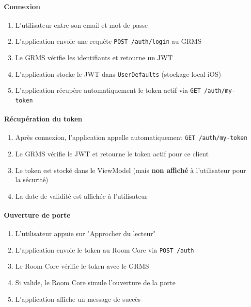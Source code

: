 \documentclass[11pt,a4paper]{article}
\begin{document}
\paragraph{Connexion}
\begin{enumerate}
    \item L'utilisateur entre son email et mot de passe
    \item L'application envoie une requête \texttt{POST /auth/login} au GRMS
    \item Le GRMS vérifie les identifiants et retourne un JWT
    \item L'application stocke le JWT dans \texttt{UserDefaults} (stockage local iOS)
    \item L'application récupère automatiquement le token actif via \texttt{GET /auth/my-token}
\end{enumerate}

\paragraph{Récupération du token}
\begin{enumerate}
    \item Après connexion, l'application appelle automatiquement \texttt{GET /auth/my-token}
    \item Le GRMS vérifie le JWT et retourne le token actif pour ce client
    \item Le token est stocké dans le ViewModel (mais \textbf{non affiché} à l'utilisateur pour la sécurité)
    \item La date de validité est affichée à l'utilisateur
\end{enumerate}

\paragraph{Ouverture de porte}
\begin{enumerate}
    \item L'utilisateur appuie sur "Approcher du lecteur"
    \item L'application envoie le token au Room Core via \texttt{POST /auth}
    \item Le Room Core vérifie le token avec le GRMS
    \item Si valide, le Room Core simule l'ouverture de la porte
    \item L'application affiche un message de succès
\end{enumerate}
\end{document}
